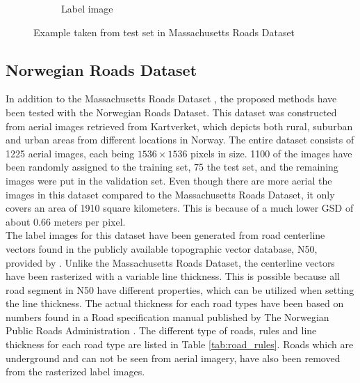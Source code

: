 \begin{figure}
\begin{subfigure}{0.48\textwidth}
\caption{Label image} \label{fig:mass_roads_example_label}
\end{subfigure}
\hspace*{\fill} %
\caption{Example taken from test set in Massachusetts Roads Dataset} \label{fig:mass_roads_example}
\end{figure}





\subsection{Norwegian Roads Dataset}
In addition to the Massachusetts Roads Dataset \citep{MnihThesis}, the proposed methods have been tested with the Norwegian Roads Dataset. This dataset was constructed from aerial images retrieved from Kartverket, which depicts both rural, suburban and urban areas from different locations in Norway. The entire dataset consists of 1225 aerial images, each being $1536\times 1536$ pixels in size. 1100 of the images have been randomly assigned to the training set, 75 the test set, and the remaining images were put in the validation set. Even though there are more aerial the images in this dataset compared to the Massachusetts Roads Dataset, it only covers an area of 1910 square kilometers. This is because of a much lower \ac{GSD} of about 0.66 meters per pixel. \\


The label images for this dataset have been generated from road centerline vectors found in the publicly available topographic vector database, N50, provided by \cite{Kartverket}. Unlike the Massachusetts Roads Dataset, the centerline vectors have been rasterized with a variable line thickness. This is possible because all road segment in N50 have different properties, which can be utilized when setting the line thickness. The actual thickness for each road types have been based on numbers found in a Road specification manual published by  The Norwegian Public Roads Administration \citep{Norwegian_road_manual}. The different type of roads, rules and line thickness for each road type are listed in Table \ref{tab:road_rules}. Roads which are underground and can not be seen from aerial imagery, have also been removed from the rasterized label images. \\

